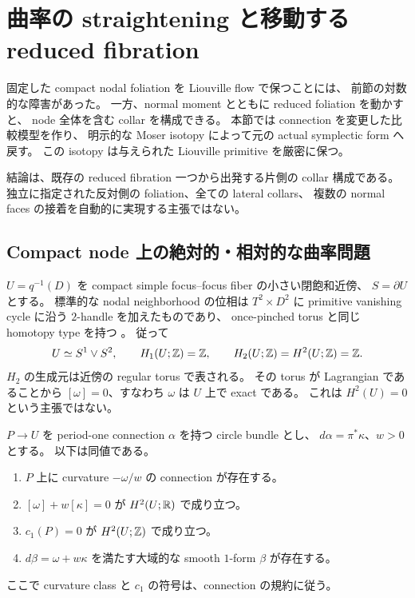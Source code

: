 \section{曲率の straightening と移動する reduced fibration}
\label{mc:main}

固定した compact nodal foliation を Liouville flow で保つことには、
前節の対数的な障害があった。
一方、normal moment とともに reduced foliation を動かすと、
node 全体を含む collar を構成できる。
本節では connection を変更した比較模型を作り、
明示的な Moser isotopy によって元の actual symplectic form へ戻す。
この isotopy は与えられた Liouville primitive を厳密に保つ。

結論は、既存の reduced fibration 一つから出発する片側の collar 構成である。
独立に指定された反対側の foliation、全ての lateral collars、
複数の normal faces の接着を自動的に実現する主張ではない。

\subsection{Compact node 上の絶対的・相対的な曲率問題}
\label{mc:topology}

$U=q^{-1}(D)$ を compact simple focus--focus fiber の小さい閉飽和近傍、
$S=\partial U$ とする。
標準的な nodal neighborhood の位相は
$T^2\times D^2$ に primitive vanishing cycle に沿う $2$-handle を加えたものであり、
once-pinched torus と同じ homotopy type を持つ
\cite[Sections 4.2, 8.1]{symington}。
従って
\[
 U\simeq S^1\vee S^2,
 \qquad H_1(U;\mathbb Z)=\mathbb Z,
 \qquad H_2(U;\mathbb Z)=H^2(U;\mathbb Z)=\mathbb Z.
\]
$H_2$ の生成元は近傍の regular torus で表される。
その torus が Lagrangian であることから $[\omega]=0$、すなわち
$\omega$ は $U$ 上で exact である。
これは $H^2(U)=0$ という主張ではない。

\begin{proposition}
\label{mc:connection-existence}
$P\to U$ を period-one connection $\alpha$ を持つ circle bundle とし、
$d\alpha=\pi^*\kappa$、$w>0$ とする。
以下は同値である。
\begin{enumerate}
\item $P$ 上に curvature $-\omega/w$ の connection が存在する。
\item $[\omega]+w[\kappa]=0$ が $H^2(U;\mathbb R)$ で成り立つ。
\item $c_1(P)=0$ が $H^2(U;\mathbb Z)$ で成り立つ。
\item $d\beta=\omega+w\kappa$ を満たす大域的な smooth $1$-form $\beta$ が存在する。
\end{enumerate}
ここで curvature class と $c_1$ の符号は、connection の規約に従う。
\end{proposition}

